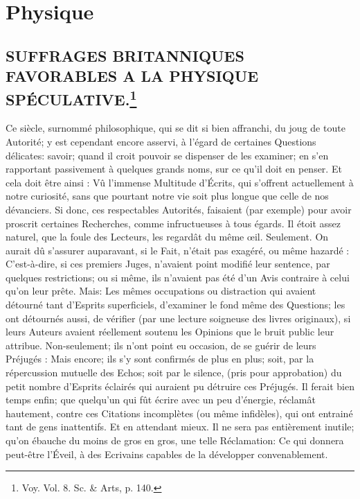 \setcounter{page}{24}
\chapter{Physique}
\section{SUFFRAGES BRITANNIQUES FAVORABLES A LA PHYSIQUE SPÉCULATIVE.\footnote{Voy. Vol. 8. Sc. & Arts, p. 140.}}
Ce siècle, surnommé philosophique, qui se dit si bien affranchi, du joug de toute Autorité; y est cependant encore asservi, à l'égard de certaines Questions délicates: savoir; quand il croit pouvoir se dispenser de les examiner;\setcounter{page}{25} en s'en rapportant passivement à quelques grands noms, sur ce qu'il doit en penser. Et cela doit être ainsi : Vû l'immense Multitude d'Écrits, qui s'offrent actuellement à notre curiosité, sans que pourtant notre vie soit plus longue que celle de nos dévanciers.
Si donc, ces respectables Autorités, faisaient (par exemple) pour avoir proscrit certaines Recherches, comme infructueuses à tous égards. Il étoit assez naturel, que la foule des Lecteurs, les regardât du même œil.
Seulement. On aurait dû s'assurer auparavant, si le Fait, n'était pas exagéré, ou même hazardé : C'est-à-dire, si ces premiers Juges, n'avaient point modifié leur sentence, par quelques restrictions; ou si même, ils n'avaient pas été d'un Avis contraire à celui qu'on leur prête.
Mais: Les mêmes occupations ou distraction qui avaient détourné tant d'Esprits superficiels, d'examiner le fond même des Questions; les ont détournés aussi, de vérifier (par une lecture soigneuse des livres originaux), si leurs Auteurs avaient réellement soutenu les Opinions que le bruit public leur attribue.
Non-seulement; ils n'ont point eu occasion, de se guérir de leurs Préjugés : Mais encore; ils s'y sont confirmés de plus en plus; soit, par la répercussion mutuelle des Echos; soit par le silence, (pris pour approbation) du petit\setcounter{page}{26} nombre d'Esprits éclairés qui auraient pu détruire ces Préjugés. Il ferait bien temps enfin; que quelqu'un qui fût écrire avec un peu d'énergie, réclamât hautement, contre ces Citations incomplètes (ou même infidèles), qui ont entrainé tant de gens inattentifs. Et en attendant mieux. Il ne sera pas entièrement inutile; qu'on ébauche du moins de gros en gros, une telle Réclamation: Ce qui donnera peut-être l'Éveil, à des Ecrivains capables de la développer convenablement.
